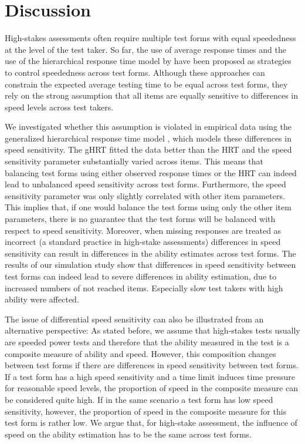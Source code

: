 \documentclass[a4paper,man,apacite,floatsintext,donotrepeattitle]{apa6}
\begin{document}
\section{Discussion}
High-stakes assessments often require multiple test forms with equal speededness at the level of the test taker. So far, the use of average response times and the use of the hierarchical response time model by  have been proposed as strategies to control speededness across test forms. Although these approaches can constrain the expected average testing time to be equal across test forms, they rely on the strong assumption that all items are equally sensitive to differences in speed levels across test takers. 

We investigated whether this assumption is violated in empirical data using the generalized hierarchical response time model \cite{Fox.2007}, which models these differences in speed sensitivity. The gHRT fitted the data better than the HRT and the speed sensitivity parameter substantially varied across items. This means that balancing test forms using either observed response times or the HRT can indeed lead to unbalanced speed sensitivity across test forms. Furthermore, the speed sensitivity parameter was only slightly correlated with other item parameters. This implies that, if one would balance the test forms using only the other item parameters, there is no guarantee that the test forms will be balanced with respect to speed sensitivity. Moreover, when missing responses are treated as incorrect (a standard practice in high-stake assessments) differences in speed sensitivity can result in differences in the ability estimates across test forms. The results of our simulation study show that differences in speed sensitivity between test forms can indeed lead to severe differences in ability estimation, due to increased numbers of not reached items. Especially slow test takers with high ability were affected. 

The issue of differential speed sensitivity can also be illustrated from an alternative perspective: As stated before, we assume that high-stakes tests usually are speeded power tests and therefore that the ability measured in the test is a composite measure of ability and speed. However, this composition changes between test forms if there are differences in speed sensitivity between test forms. If a test form has a high speed sensitivity and a time limit induces time pressure for reasonable speed levels, the proportion of speed in the composite measure can be considered quite high. If in the same scenario a test form has low speed sensitivity, however, the proportion of speed in the composite measure for this test form is rather low. We argue that, for high-stake assessment, the influence of speed on the ability estimation has to be the same across test forms. 
\end{document}
